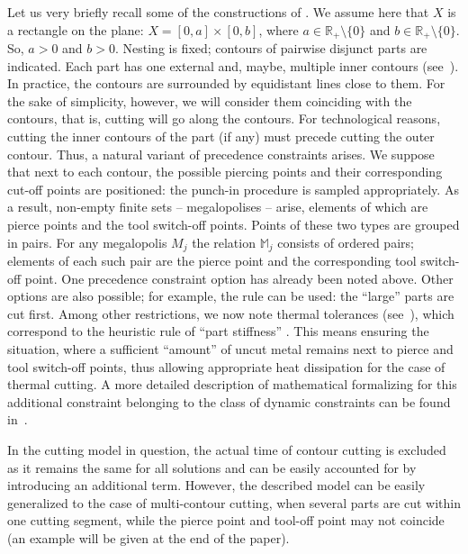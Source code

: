 
Let us very briefly recall some of the constructions of
\cite [$\S$ 3.3]{4}.
We assume here that $ X $ is a rectangle on the plane:
$X = [0,a] \times [0,b]$,
where
$a \in \mathbb{R}_+ \setminus \{0\}$
and $b \in \mathbb{R}_+ \setminus \{0\}.$
So, $a > 0$ and
$b > 0$.
Nesting is fixed;
contours of pairwise disjunct parts are indicated.
Each part has one external and,
maybe,
multiple inner contours
(see~\cite[\S~3.2]{4}).
In practice,
the contours are surrounded by equidistant lines close to them.
For the sake of simplicity,
however,
we will consider them coinciding with the contours,
that is, cutting will go along the contours.
For technological reasons,
cutting the inner contours of the part
(if any)
must precede cutting the outer contour.
Thus, a natural variant of precedence constraints arises.
We suppose
that next to each contour, the possible
piercing points and their corresponding cut-off points
are positioned:
the punch-in procedure is sampled appropriately.
As a result, non-empty finite sets
-- megalopolises --
arise,
elements of which are pierce points
and the tool switch-off points.
Points of these two types are grouped in pairs.
For any megalopolis
$M_j$
the relation
$\mathbb{M}_j$
consists of ordered pairs;
elements of each such pair are
the pierce point
and the corresponding tool switch-off point.
One precedence constraint option has already been noted above.
Other options are also possible;
for example, the rule can be used: the ``large'' parts are cut first.
Among other restrictions, we now note
thermal tolerances (see~\cite{18}),
which correspond to the heuristic rule of ``part stiffness''
\cite{4}.
This means ensuring the situation,
where
a sufficient ``amount''
of uncut metal remains next to pierce and tool switch-off points, thus allowing appropriate
heat dissipation for the case of thermal cutting.
A more detailed description of mathematical
formalizing for this additional
constraint belonging to the class of dynamic constraints
can be found in~\cite{18}.

In the cutting model in question,
the actual time of contour cutting
is excluded
as it remains the same for all solutions
and can be easily accounted for by introducing an
additional term.
However,
the described model can be easily generalized to
the case of multi-contour cutting,
when
several parts are cut within one cutting segment,
while the pierce point
and tool-off point
may not coincide
(an example will be given at the end
of the paper).

